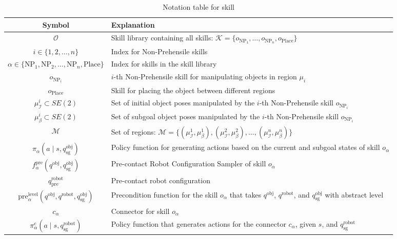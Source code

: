 \begin{table}[h!]
\large
\centering
\begin{adjustbox}{width=\columnwidth} %
\begin{tabular}{|c|p{}|} %
\hline
\textbf{Symbol} & \textbf{Explanation} \\ \hline

$\mathcal{O}$ & Skill library containing all skills: $\mathcal{K} = \{o_{\text{NP}_1}, \dots, o_{\text{NP}_n}, o_{\text{Place}}\}$ \\ \hline
$i \in \{1, 2, \dots, n\}$ & Index for Non-Prehensile skills \\ \hline
$\alpha \in \{\text{NP}_1, \text{NP}_2, \dots, \text{NP}_n, \text{Place}\}$ & Index for skills in the skill library \\ \hline
$o_{\text{NP}_i}$ & $i$-th Non-Prehensile skill for manipulating objects in region $\mu_i$ \\ \hline
$o_{\text{Place}}$ & Skill for placing the object between different regions \\ \hline
$\mu^i_\mathcal{I} \subset SE(2)$ & Set of initial object poses manipulated by the $i$-th Non-Prehensile skill $o_{\text{NP}_i}$ \\ \hline
$\mu^i_\beta \subset SE(2)$ & Set of subgoal object poses manipulated by the $i$-th Non-Prehensile skill $o_{\text{NP}_i}$ \\ \hline
$\mathcal{M}$ & Set of regions: $\mathcal{M} = \{(\mu^1_{\mathcal{I}}, \mu^1_\beta), (\mu^2_{\mathcal{I}}, \mu^2_\beta), \dots, (\mu^n_{\mathcal{I}}, \mu^n_\beta) \}$ \\ \hline
$\pi_\alpha(a \mid s, q^{\text{obj}}_\text{sg})$ & Policy function for generating actions based on the current and subgoal states of skill $o_\alpha$\\ \hline
$f_\alpha^{\text{pre}}(q^{\text{obj}}, q^{\text{obj}}_\text{sg})$ & Pre-contact Robot Configuration Sampler of skill $o_\alpha$ \\ \hline
$q^{\text{robot}}_{\text{pre}}$ & Pre-contact robot configuration \\ \hline
$\mathrm{pre}^{\text{level}}_\alpha(q^{\text{obj}}, q^{\text{robot}}, q^{\text{obj}}_{\text{sg}})$ & Precondition function for the skill $o_\alpha$ that takes $q^{\text{obj}}$, $q^{\text{robot}}$, and $q^{\text{obj}}_{\text{sg}}$ with abstract level \\ \hline
$c_\alpha$ & Connector for skill $o_\alpha$ \\ \hline
$\pi^c_\alpha(a \mid s, q^{\text{robot}}_{\text{sg}})$ & Policy function that generates actions for the connector $c_\alpha$, given $s$, and $q^{\text{robot}}_\text{sg}$ \\ \hline

\end{tabular}
\end{adjustbox}
\caption{Notation table for skill}
\label{tab:skill_notation}
\end{table}
